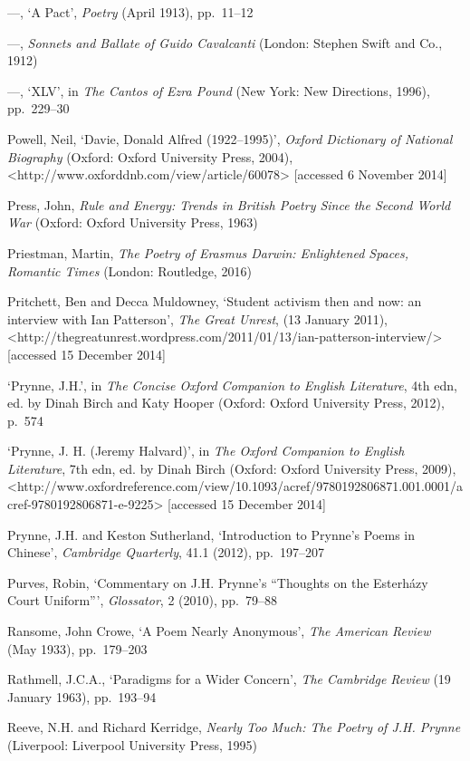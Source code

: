 \documentclass[]{article}
\begin{document}
—, ‘A Pact’, \emph{Poetry} (April 1913), pp.~11–12

—, \emph{Sonnets and Ballate of Guido Cavalcanti} (London: Stephen Swift
and Co., 1912)

—, ‘XLV’, in \emph{The Cantos of Ezra Pound} (New York: New Directions,
1996), pp.~229–30

Powell, Neil, ‘Davie, Donald Alfred (1922–1995)’, \emph{Oxford
Dictionary of National Biography} (Oxford: Oxford University Press,
2004),\\
\textless{}http://www.oxforddnb.com/view/article/60078\textgreater{}
{[}accessed 6 November 2014{]}

Press, John, \emph{Rule and Energy: Trends in British Poetry Since the
Second World War} (Oxford: Oxford University Press, 1963)

Priestman, Martin, \emph{The Poetry of Erasmus Darwin: Enlightened
Spaces, Romantic Times} (London: Routledge, 2016)

Pritchett, Ben and Decca Muldowney, ‘Student activism then and now: an
interview with Ian Patterson’, \emph{The Great Unrest}, (13 January
2011),\\
\textless{}http://thegreatunrest.wordpress.com/2011/01/13/ian-patterson-interview/\textgreater{}
{[}accessed 15 December 2014{]}

‘Prynne, J.H.’, in \emph{The Concise Oxford Companion to English
Literature}, 4th edn, ed. by Dinah Birch and Katy Hooper (Oxford: Oxford
University Press, 2012), p.~574

‘Prynne, J. H. (Jeremy Halvard)’, in \emph{The Oxford Companion to
English Literature}, 7th edn, ed. by Dinah Birch (Oxford: Oxford
University Press, 2009),\\
\textless{}http://www.oxfordreference.com/view/10.1093/acref/9780192806871.001.0001/acref-9780192806871-e-9225\textgreater{}
{[}accessed 15 December 2014{]}

Prynne, J.H. and Keston Sutherland, ‘Introduction to Prynne’s Poems in
Chinese’, \emph{Cambridge Quarterly}, 41.1 (2012), pp.~197–207

Purves, Robin, ‘Commentary on J.H. Prynne’s “Thoughts on the Esterházy
Court Uniform”’, \emph{Glossator}, 2 (2010), pp.~79–88

Ransome, John Crowe, ‘A Poem Nearly Anonymous’, \emph{The American
Review} (May 1933), pp.~179–203

Rathmell, J.C.A., ‘Paradigms for a Wider Concern’, \emph{The Cambridge
Review} (19 January 1963), pp.~193–94

Reeve, N.H. and Richard Kerridge, \emph{Nearly Too Much: The Poetry of
J.H. Prynne} (Liverpool: Liverpool University Press, 1995)
\end{document}
